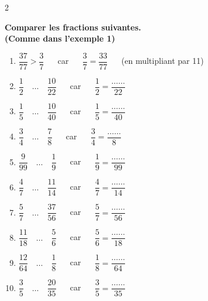 \documentclass[10pt]{article}
\begin{document}
\begin{multicols}{2}
  \begin{exercicedevoir}[5]
    \textbf{Comparer les fractions suivantes.  \\(Comme dans l'exemple
    1)}
    \begin{enumerate}
    \item $\dfrac{37}{77}>\dfrac{3}{7}$ $\quad$ car $\quad$
      $\dfrac{3}{7}=\dfrac{33}{77}$ $\quad$ (en multipliant par 11)
    \item $\dfrac{1}{2}\quad\ldots\quad\dfrac{10}{22}$ $\quad$ car $\quad$ $\dfrac{1}{2}=\dfrac{\ldots\ldots}{22}$
    \item $\dfrac{1}{5}\quad\ldots\quad\dfrac{10}{40}$ $\quad$ car $\quad$ $\dfrac{1}{5}=\dfrac{\ldots\ldots}{40}$
    \item $\dfrac{3}{4}\quad\ldots\quad\dfrac{7}{8}$ $\quad$ car $\quad$ $\dfrac{3}{4}=\dfrac{\ldots\ldots}{8}$
    \item $\dfrac{9}{99}\quad\ldots\quad\dfrac{1}{9}$ $\quad$ car $\quad$ $\dfrac{1}{9}=\dfrac{\ldots\ldots}{99}$
    \item $\dfrac{4}{7}\quad\ldots\quad\dfrac{11}{14}$ $\quad$ car $\quad$ $\dfrac{4}{7}=\dfrac{\ldots\ldots}{14}$
    \item $\dfrac{5}{7}\quad\ldots\quad\dfrac{37}{56}$ $\quad$ car $\quad$ $\dfrac{5}{7}=\dfrac{\ldots\ldots}{56}$
    \item $\dfrac{11}{18}\quad\ldots\quad\dfrac{5}{6}$ $\quad$ car $\quad$ $\dfrac{5}{6}=\dfrac{\ldots\ldots}{18}$
    \item $\dfrac{12}{64}\quad\ldots\quad\dfrac{1}{8}$ $\quad$ car $\quad$ $\dfrac{1}{8}=\dfrac{\ldots\ldots}{64}$
    \item $\dfrac{3}{5}\quad\ldots\quad\dfrac{20}{35}$ $\quad$ car $\quad$ $\dfrac{3}{5}=\dfrac{\ldots\ldots}{35}$
    \end{enumerate}
  \end{exercicedevoir}


\end{multicols}
\end{document}
